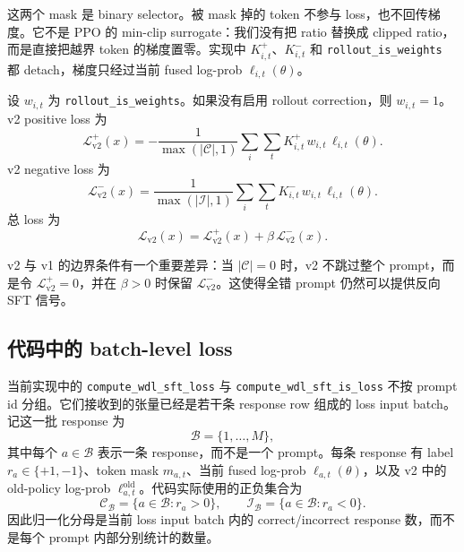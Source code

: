 这两个 mask 是 binary selector。被 mask 掉的 token 不参与 loss，也不回传梯度。它不是 PPO 的 min-clip surrogate：我们没有把 ratio 替换成 clipped ratio，而是直接把越界 token 的梯度置零。实现中 $K^+_{i,t}$、$K^-_{i,t}$ 和 \texttt{rollout\_is\_weights} 都 detach，梯度只经过当前 fused log-prob $\ell_{i,t}(\theta)$。

设 $w_{i,t}$ 为 \texttt{rollout\_is\_weights}。如果没有启用 rollout correction，则 $w_{i,t}=1$。v2 positive loss 为
\begin{equation}
    \mathcal{L}^{+}_{\mathrm{v2}}(x)
    =
    -\frac{1}{\max(|\mathcal{C}|,1)}
    \sum_i\sum_t
    K^+_{i,t}\,w_{i,t}\,\ell_{i,t}(\theta).
    \label{eq:v2_pos}
\end{equation}
v2 negative loss 为
\begin{equation}
    \mathcal{L}^{-}_{\mathrm{v2}}(x)
    =
    \frac{1}{\max(|\mathcal{I}|,1)}
    \sum_i\sum_t
    K^-_{i,t}\,w_{i,t}\,\ell_{i,t}(\theta).
    \label{eq:v2_neg}
\end{equation}
总 loss 为
\begin{equation}
    \mathcal{L}_{\mathrm{v2}}(x)
    =
    \mathcal{L}^{+}_{\mathrm{v2}}(x)
    +
    \beta\,\mathcal{L}^{-}_{\mathrm{v2}}(x).
    \label{eq:v2_total}
\end{equation}

v2 与 v1 的边界条件有一个重要差异：当 $|\mathcal{C}|=0$ 时，v2 不跳过整个 prompt，而是令 $\mathcal{L}^{+}_{\mathrm{v2}}=0$，并在 $\beta>0$ 时保留 $\mathcal{L}^{-}_{\mathrm{v2}}$。这使得全错 prompt 仍然可以提供反向 SFT 信号。

\subsection{代码中的 batch-level loss}
\label{subsec:batch_loss_impl}

当前实现中的 \texttt{compute\_wdl\_sft\_loss} 与 \texttt{compute\_wdl\_sft\_is\_loss} 不按 prompt id 分组。它们接收到的张量已经是若干条 response row 组成的 loss input batch。记这一批 response 为
\begin{equation}
    \mathcal{B}=\{1,\ldots,M\},
\end{equation}
其中每个 $a\in\mathcal{B}$ 表示一条 response，而不是一个 prompt。每条 response 有 label $r_a\in\{+1,-1\}$、token mask $m_{a,t}$、当前 fused log-prob $\ell_{a,t}(\theta)$，以及 v2 中的 old-policy log-prob $\ell^{\mathrm{old}}_{a,t}$。代码实际使用的正负集合为
\begin{equation}
    \mathcal{C}_{\mathcal{B}}=\{a\in\mathcal{B}:r_a>0\},
    \qquad
    \mathcal{I}_{\mathcal{B}}=\{a\in\mathcal{B}:r_a<0\}.
\end{equation}
因此归一化分母是当前 loss input batch 内的 correct/incorrect response 数，而不是每个 prompt 内部分别统计的数量。

